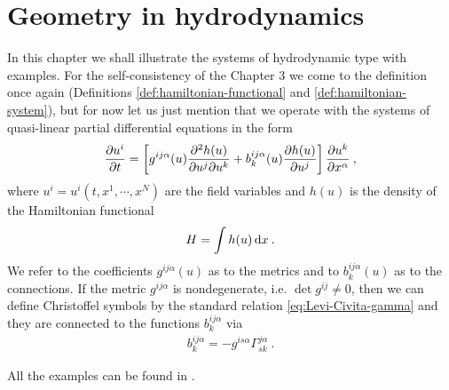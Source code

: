 \chapter{Geometry in hydrodynamics}

In this chapter we shall illustrate the systems of hydrodynamic type with examples.
For the self-consistency of the Chapter 3 we come to the definition once again (Definitions \vref{def:hamiltonian-functional} and \vref{def:hamiltonian-system}), but for now let us just mention that we operate with the systems of quasi-linear partial differential equations in the form
\begin{align}
    \frac{\partial u^i}{\partial t} = \left[ g^{ij \alpha} (u) \frac{\partial^2 h(u)}{\partial u^j \partial u^k} + b_k^{ij \alpha} (u) \frac{\partial h(u)}{\partial u^j} \right] \frac{\partial u^k}{\partial x^\alpha} \:,
\end{align}
where $u^i = u^i(t,x^1, \cdots, x^N)$ are the field variables and $h(u)$ is the density of the Hamiltonian functional
\begin{align}
    H = \int h(u) \, \mathrm{d} x \:.
\end{align}
We refer to the coefficients $g^{ij \alpha}(u)$ as to the metrics and to $b^{ij \alpha}_k(u)$ as to the connections. If the metric $g^{ij \alpha}$ is nondegenerate, i.e. $\det g^{ij} \neq 0$, then we can define Christoffel symbols by the standard relation \eqref{eq:Levi-Civita-gamma} and they are connected to the functions $b^{ij \alpha}_k$ via
\begin{align}
    b^{ij \alpha}_k = - g^{i s \alpha} \Gamma^{j \alpha}_{sk} \:.
\end{align}

All the examples can be found in \cite{Pavelka}.

